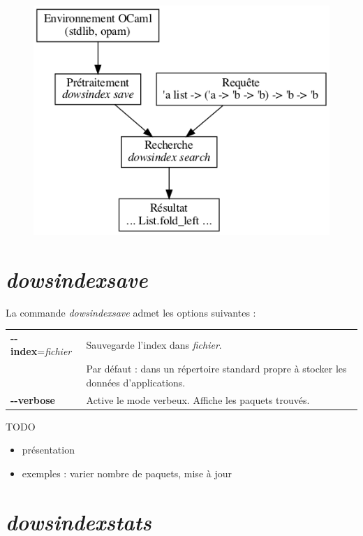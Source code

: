 \documentclass [a4paper] {report}
\theoremstyle {definition}
\newcommand {\dowsindex} {\textit{dowsindex}\xspace}
\begin{document}
\begin {figure} [h]
\begin {center}
	\includegraphics [scale=0.35] {graphs/dowsindex}
\end {center}
\end {figure}

\section {\dowsindex \textit {save}}

La commande \dowsindex \textit {save} admet les options suivantes :

\begin {table} [h]
\begin {tabular} {ll}
		\textbf{-{}-index}=\textit{fichier} &
		Sauvegarde l'index dans \textit {fichier}. \\ &
		Par défaut : dans un répertoire standard propre à stocker les données d'applications.
	\\
		\textbf {-{}-verbose} &
		Active le mode verbeux. Affiche les paquets trouvés.
\end {tabular}
\end {table}

TODO
\begin {itemize}
	\item présentation
	\item exemples : varier nombre de paquets, mise à jour
\end {itemize}

\section {\dowsindex \textit {stats}}
\end{document}
